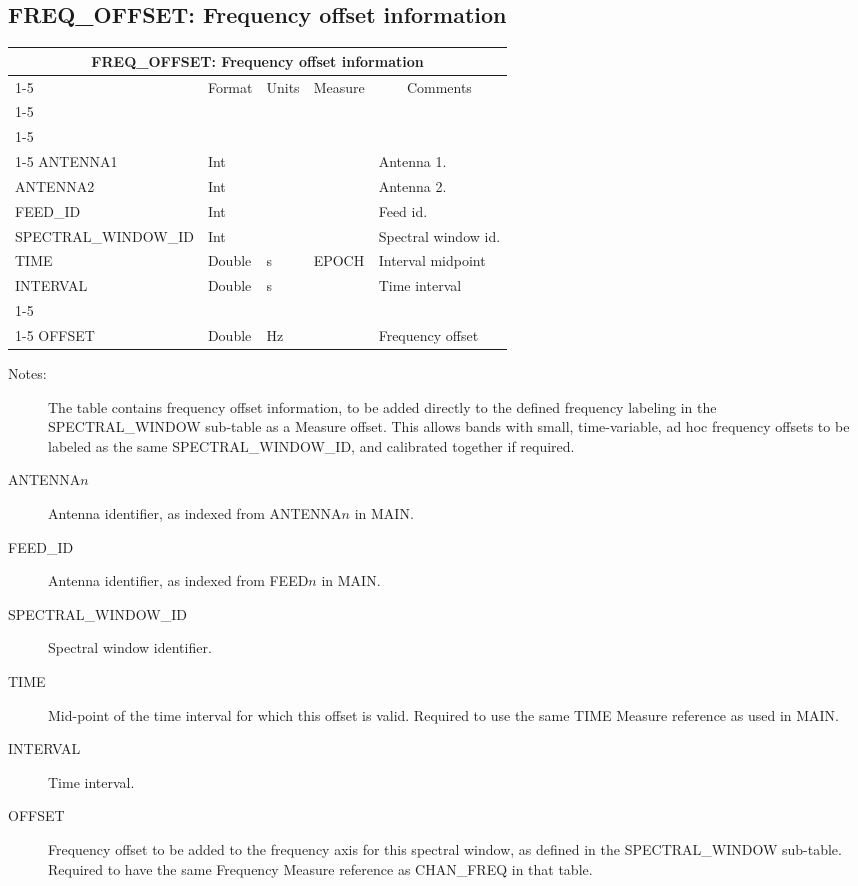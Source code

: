 \documentclass{article}
\newcommand{\defline}[1]{\cline{1-5}
\multicolumn{5}{|l|}{#1} \\
\cline{1-5}}
\newcommand{\definetable}[2]
{
	\vfill\newpage
	\subsection{#1}
        \vspace{0.15in}
        \small
	\begin{tabular}{|l|p{1.25in}|l|p{.9in}|p{1.4in}|}
	\hline
	\multicolumn{5}{|c|}{\bf #1}\\ 
	\cline{1-5}
        \multicolumn{1}{|c|}{Name}&\multicolumn{1}{|c|}{Format}&
        \multicolumn{1}{|c|}{Units}&\multicolumn{1}{|c|}{Measure}&
        \multicolumn{1}{|c|}{Comments}\\
        \cline{1-5}
        #2
        \hline
	\end{tabular}
}
\begin{document}
\definetable{FREQ\_OFFSET: Frequency offset information}{
\defline{\bf Columns}
\defline{\em Key}
ANTENNA1  &   Int  & & & Antenna 1.\\
ANTENNA2  &   Int  & & & Antenna 2.\\
FEED\_ID     &   Int  & & & Feed id.\\
SPECTRAL\_WINDOW\_ID & Int & & & Spectral window id.\\
TIME & Double & s & EPOCH & Interval midpoint\\
INTERVAL & Double & s & & Time interval\\
\defline{\em Data}
OFFSET   &  Double & Hz &  & Frequency offset\\
}
\begin{description}

\item[Notes:] The table contains frequency offset information, to be
added directly to the defined frequency labeling in the
SPECTRAL\_WINDOW sub-table as a Measure offset. This allows bands with
small, time-variable, ad hoc frequency offsets to be labeled as the same
SPECTRAL\_WINDOW\_ID, and calibrated together if required.

\item[ANTENNA$n$] Antenna identifier, as indexed from ANTENNA$n$ in MAIN.

\item[FEED\_ID] Antenna identifier, as indexed from FEED$n$ in MAIN.

\item[SPECTRAL\_WINDOW\_ID] Spectral window identifier.

\item[TIME] Mid-point of the time interval for which this offset is valid.
Required to use the same TIME Measure reference as used in MAIN.

\item[INTERVAL] Time interval.

\item[OFFSET] Frequency offset to be added to the frequency axis for
this spectral window, as defined in the SPECTRAL\_WINDOW
sub-table. Required to have the same Frequency Measure reference as
CHAN\_FREQ in that table.

\end{description}
\end{document}
